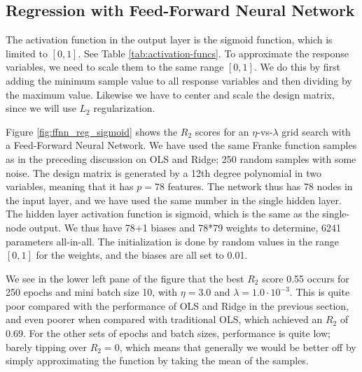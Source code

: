 \documentclass[]{article}
\begin{document}
\subsection{Regression with Feed-Forward Neural Network}



The activation function in the output layer is the sigmoid function, which is limited to $[0,1]$. See Table \ref{tab:activation-funcs}. To approximate the response variables, we need to scale them to the same range $[0,1]$. We do this by first adding the minimum sample value to all response variables and then dividing by the maximum value. Likewise we have to center and scale the design matrix, since we will use $L_2$ regularization.

Figure \ref{fig:ffnn_reg_sigmoid} shows the $R_2$ scores for an $\eta$-vs-$\lambda$ grid search with a Feed-Forward Neural Network. We have used the same Franke function samples as in the preceding discussion on OLS and Ridge; 250 random samples with some noise. The design matrix is generated by a 12th degree polynomial in two variables, meaning that it has $p = 78$ features. The network thus has 78 nodes in the input layer, and we have used the same number in the single hidden layer. The hidden layer activation function is sigmoid, which is the same as the single-node output. We thus have 78+1 biases and 78*79 weights to determine, 6241 parameters all-in-all. The initialization is done by random values in the range $[0,1]$ for the weights, and the biases are all set to 0.01.

We see in the lower left pane of the figure that the best $R_2$ score 0.55 occurs for 250 epochs and mini batch size 10, with $\eta = 3.0$ and $\lambda = 1.0 \cdot 10^{-3}$. This is quite poor compared with the performance of OLS and Ridge in the previous section, and even poorer when compared with traditional OLS, which achieved an $R_2$ of 0.69. For the other sets of epochs and batch sizes, performance is quite low; barely tipping over $R_2 = 0$, which means that generally we would be better off by simply approximating the function by taking the mean of the samples.
\end{document}
